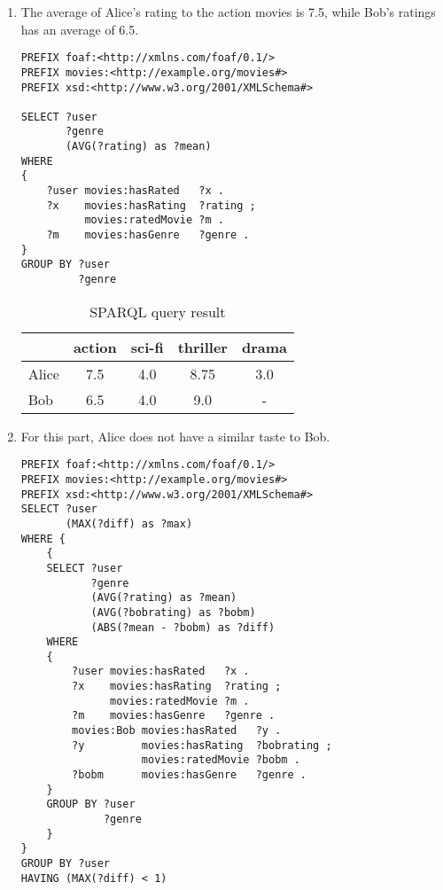\documentclass[DIN, pagenumber=false, fontsize=11pt, parskip=half]{scrartcl}
\begin{document}
\begin{enumerate}[label=\alph*)]

\item The average of Alice's rating to the action movies is 7.5, while Bob's ratings has an average of 6.5.

\begin{lstlisting}[captionpos=b, caption=SPARQL query :: average of ratings in action genre, label=lst:sparql,
   basicstyle=\ttfamily,frame=single]
PREFIX foaf:<http://xmlns.com/foaf/0.1/>
PREFIX movies:<http://example.org/movies#>
PREFIX xsd:<http://www.w3.org/2001/XMLSchema#>

SELECT ?user
       ?genre
       (AVG(?rating) as ?mean)
WHERE
{
    ?user movies:hasRated   ?x .
    ?x    movies:hasRating  ?rating ;
          movies:ratedMovie ?m .
    ?m    movies:hasGenre   ?genre .
}
GROUP BY ?user
         ?genre
\end{lstlisting}

\begin{table}[!ht]
    \centering
    \begin{tabular}{l|cccc}
         & action & sci-fi & thriller & drama \\
        \hline
        Alice & 7.5 & 4.0 & 8.75 & 3.0 \\
        Bob & 6.5 & 4.0 & 9.0 & -
    \end{tabular}
    \caption{SPARQL query result}
    \label{tab:my_label}
\end{table}

\item
For this part, Alice does not have a similar taste to Bob.

\begin{lstlisting}[captionpos=b, caption=Finding people similar to Bob, label=lst:sparql,
   basicstyle=\ttfamily,frame=single]
PREFIX foaf:<http://xmlns.com/foaf/0.1/>
PREFIX movies:<http://example.org/movies#>
PREFIX xsd:<http://www.w3.org/2001/XMLSchema#>
SELECT ?user
       (MAX(?diff) as ?max)
WHERE {
    {
    SELECT ?user
           ?genre
           (AVG(?rating) as ?mean)
           (AVG(?bobrating) as ?bobm)
           (ABS(?mean - ?bobm) as ?diff)
    WHERE
    {
        ?user movies:hasRated   ?x .
        ?x    movies:hasRating  ?rating ;
              movies:ratedMovie ?m .
        ?m    movies:hasGenre   ?genre .
        movies:Bob movies:hasRated   ?y .
        ?y         movies:hasRating  ?bobrating ;
                   movies:ratedMovie ?bobm .
        ?bobm      movies:hasGenre   ?genre .
    }
    GROUP BY ?user
             ?genre
    }
}
GROUP BY ?user
HAVING (MAX(?diff) < 1)
\end{lstlisting}

\end{enumerate}
\end{document}
